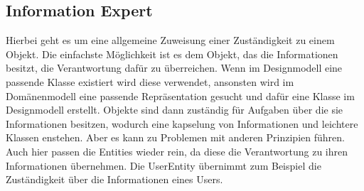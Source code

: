 \subsection{Information Expert}
Hierbei geht es um eine allgemeine Zuweisung einer Zuständigkeit zu einem Objekt.
Die einfachste Möglichkeit ist es dem Objekt, das die Informationen besitzt, die Verantwortung dafür zu überreichen.
Wenn im Designmodell eine passende Klasse existiert wird diese verwendet, ansonsten wird im Domänenmodell eine passende Repräsentation gesucht und dafür eine Klasse im Designmodell erstellt.
Objekte sind dann zuständig für Aufgaben über die sie Informationen besitzen, wodurch eine kapselung von Informationen und leichtere Klassen enstehen.
Aber es kann zu Problemen mit anderen Prinzipien führen.
Auch hier passen die Entities wieder rein, da diese die Verantwortung zu ihren Informationen übernehmen.
Die UserEntity übernimmt zum Beispiel die Zuständigkeit über die Informationen eines Users.
